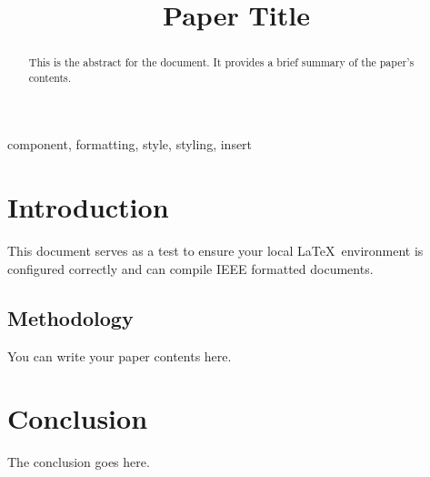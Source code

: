 \documentclass[conference]{IEEEtran}
\begin{document}
\title{Paper Title}

\author{
}

\maketitle

\begin{abstract}
This is the abstract for the document. It provides a brief summary of the paper's contents.
\end{abstract}

\begin{IEEEkeywords}
component, formatting, style, styling, insert
\end{IEEEkeywords}

\section{Introduction}
This document serves as a test to ensure your local \LaTeX\ environment is configured correctly and can compile IEEE formatted documents.

\subsection{Methodology}
You can write your paper contents here. 

\section{Conclusion}
The conclusion goes here.
\end{document}

